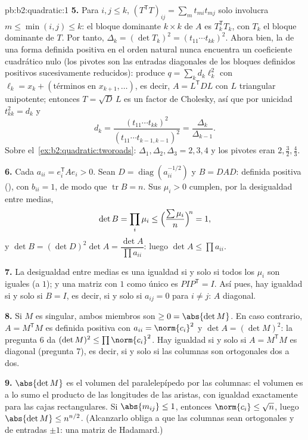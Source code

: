 \begin{solution}{pb:b2:quadratic:1}
\textbf{5.} Para $i, j \leq k$, $(T^{\mathsf T}T)_{ij} = \sum_m
t_{mi}t_{mj}$ solo involucra $m \leq \min(i,j) \leq k$: el bloque
dominante $k\times k$ de $A$ es $T_k^{\mathsf T}T_k$, con $T_k$ el
bloque dominante de $T$. Por tanto, $\Delta_k = (\det T_k)^2 =
(t_{11}\cdots t_{kk})^2$. Ahora bien, la  de una
forma definida positiva en el orden natural nunca encuentra un
coeficiente cuadrático nulo (los pivotes son las entradas diagonales de
los bloques definidos positivos sucesivamente reducidos): produce $q =
\sum_k d_k\ell_k^2$ con $\ell_k = x_k + (\text{términos en } x_{k+1},
\dots)$, es decir, $A = L^{\mathsf T}DL$ con $L$ triangular unipotente;
entonces $T = \sqrt D\,L$ es un factor de Cholesky, así que por
unicidad $t_{kk}^2 = d_k$ y
\[
d_k = \frac{(t_{11}\cdots t_{kk})^2}
{(t_{11}\cdots t_{k-1,k-1})^2}
= \frac{\Delta_k}{\Delta_{k-1}} .
\]
Sobre el~\cref{ex:b2:quadratic:tworoads}: $\Delta_1, \Delta_2,
\Delta_3 = 2, 3, 4$ y los pivotes eran $2, \frac32, \frac43$.

\textbf{6.} Cada $a_{ii} = e_i^{\mathsf T}Ae_i > 0$. Sean $D =
\operatorname{diag}(a_{ii}^{-1/2})$ y $B = DAD$: definida positiva
(), con $b_{ii} = 1$, de modo que $\operatorname{tr} B = n$.
Sus  $\mu_i > 0$ cumplen, por la desigualdad entre
medias,
\[
\det B = \prod_i\mu_i
\leq \Bigl(\frac{\sum\mu_i}{n}\Bigr)^{\!n} = 1 ,
\]
y $\det B = (\det D)^2\det A = \dfrac{\det A}{\prod a_{ii}}$: luego
$\det A \leq \prod a_{ii}$.

\textbf{7.} La desigualdad entre medias es una igualdad si y solo si
todos los $\mu_i$ son iguales (a $1$); y una matriz  con
$1$ como único  es $PIP^{\mathsf T} = I$. Así pues, hay
igualdad si y solo si $B = I$, es decir, si y solo si $a_{ij} = 0$ para
$i \neq j$: $A$ diagonal.

\textbf{8.} Si $M$ es singular, ambos miembros son $\geq 0 = \abs{\det
M}$. En caso contrario, $A = M^{\mathsf T}M$ es definida positiva con
$a_{ii} = \norm{c_i}^2$ y $\det A = (\det M)^2$: la pregunta 6 da
$(\det M)^2 \leq \prod\norm{c_i}^2$. Hay igualdad si y solo si $A =
M^{\mathsf T}M$ es diagonal (pregunta 7), es decir, si y solo si las
columnas son ortogonales dos a dos.

\textbf{9.} $\abs{\det M}$ es el volumen del paralelepípedo 
por las columnas: el volumen es a lo sumo el producto de las longitudes
de las aristas, con igualdad exactamente para las cajas rectangulares.
Si $\abs{m_{ij}} \leq 1$, entonces $\norm{c_i} \leq \sqrt n$, luego
$\abs{\det M} \leq n^{n/2}$. (Alcanzarlo obliga a que las columnas sean
ortogonales y de entradas $\pm1$: una matriz de Hadamard.)


\end{solution}

